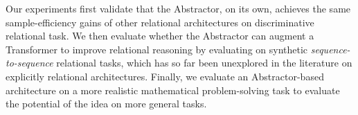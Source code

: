 Our experiments first validate that the Abstractor, on its own, achieves the same sample-efficiency gains of other relational architectures on discriminative relational task. We then evaluate whether the Abstractor can augment a Transformer to improve relational reasoning by evaluating on synthetic \textit{sequence-to-sequence} relational tasks, which has so far been unexplored in the literature on explicitly relational architectures. Finally, we evaluate an Abstractor-based architecture on a more realistic mathematical problem-solving task to evaluate the potential of the idea on more general tasks.

